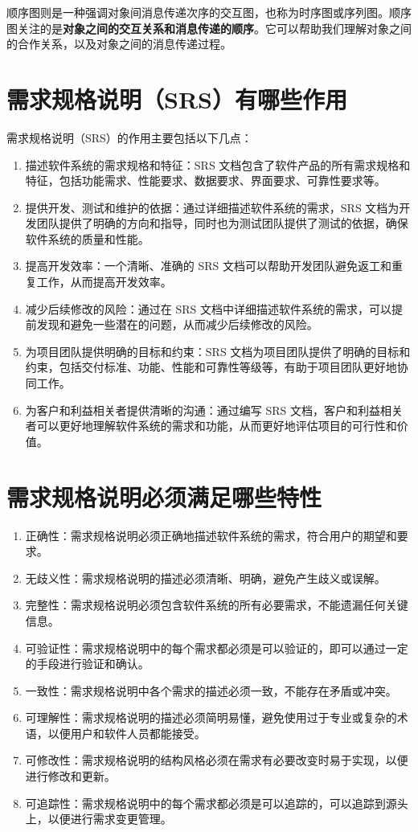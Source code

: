 \documentclass[11pt, a4paper, oneside]{ctexbook}
\begin{document}
顺序图则是一种强调对象间消息传递次序的交互图，也称为时序图或序列图。顺序图关注的是\textbf{对象之间的交互关系和消息传递的顺序}。它可以帮助我们理解对象之间的合作关系，以及对象之间的消息传递过程。

\section{需求规格说明（SRS）有哪些作用}
需求规格说明（SRS）的作用主要包括以下几点：
\begin{enumerate}
    \item 描述软件系统的需求规格和特征：SRS 文档包含了软件产品的所有需求规格和特征，包括功能需求、性能要求、数据要求、界面要求、可靠性要求等。
    \item 提供开发、测试和维护的依据：通过详细描述软件系统的需求，SRS 文档为开发团队提供了明确的方向和指导，同时也为测试团队提供了测试的依据，确保软件系统的质量和性能。
    \item 提高开发效率：一个清晰、准确的 SRS 文档可以帮助开发团队避免返工和重复工作，从而提高开发效率。
    \item 减少后续修改的风险：通过在 SRS 文档中详细描述软件系统的需求，可以提前发现和避免一些潜在的问题，从而减少后续修改的风险。
    \item 为项目团队提供明确的目标和约束：SRS 文档为项目团队提供了明确的目标和约束，包括交付标准、功能、性能和可靠性等级等，有助于项目团队更好地协同工作。
    \item 为客户和利益相关者提供清晰的沟通：通过编写 SRS 文档，客户和利益相关者可以更好地理解软件系统的需求和功能，从而更好地评估项目的可行性和价值。
\end{enumerate}
\section{需求规格说明必须满足哪些特性}
\begin{enumerate}
    \item 正确性：需求规格说明必须正确地描述软件系统的需求，符合用户的期望和要求。
    \item 无歧义性：需求规格说明的描述必须清晰、明确，避免产生歧义或误解。
    \item 完整性：需求规格说明必须包含软件系统的所有必要需求，不能遗漏任何关键信息。
    \item 可验证性：需求规格说明中的每个需求都必须是可以验证的，即可以通过一定的手段进行验证和确认。
    \item 一致性：需求规格说明中各个需求的描述必须一致，不能存在矛盾或冲突。
    \item 可理解性：需求规格说明的描述必须简明易懂，避免使用过于专业或复杂的术语，以便用户和软件人员都能接受。
    \item 可修改性：需求规格说明的结构风格必须在需求有必要改变时易于实现，以便进行修改和更新。
    \item 可追踪性：需求规格说明中的每个需求都必须是可以追踪的，可以追踪到源头上，以便进行需求变更管理。
\end{enumerate}
\end{document}
